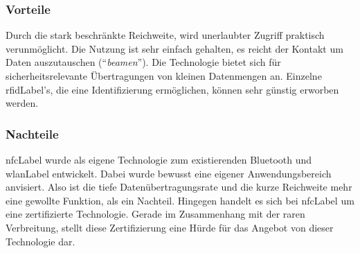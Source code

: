 \subsubsection{Vorteile}
Durch die stark beschränkte Reichweite, wird unerlaubter Zugriff praktisch verunmöglicht.
Die Nutzung ist sehr einfach gehalten, es reicht der Kontakt um Daten auszutauschen ("`\textit{beamen}"').
Die Technologie bietet sich für sicherheitsrelevante Übertragungen von kleinen Datenmengen an.
Einzelne \gls{rfidLabel}'s, die eine Identifizierung ermöglichen, können sehr günstig erworben werden.

\subsubsection{Nachteile}
\gls{nfcLabel} wurde als eigene Technologie zum existierenden Bluetooth und \gls{wlanLabel} entwickelt. Dabei wurde bewusst eine eigener Anwendungsbereich anvisiert. Also ist die tiefe Datenübertragungsrate und die kurze Reichweite mehr eine gewollte Funktion, als ein Nachteil.
Hingegen handelt es sich bei \gls{nfcLabel} um eine zertifizierte Technologie.
Gerade im Zusammenhang mit der raren Verbreitung, stellt diese Zertifizierung eine Hürde für das Angebot von dieser Technologie dar.




